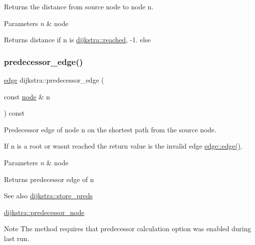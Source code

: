 Returns the distance from source node to node {\ttfamily n}. 


\begin{DoxyParams}{Parameters}
{\em n} & node\\
\hline
\end{DoxyParams}
\begin{DoxyReturn}{Returns}
distance if {\ttfamily n} is \mbox{\hyperlink{classdijkstra_a405ff80abfc9ad98668534032eed6a5b}{dijkstra\+::reached}}, {\ttfamily -\/1.} else 
\end{DoxyReturn}
\mbox{\label{classdijkstra_aa3ef1a7d7dfc33e4a39aff309f873929}} 
\subsubsection{\texorpdfstring{predecessor\+\_\+edge()}{predecessor\_edge()}}
{\footnotesize\ttfamily \mbox{\hyperlink{classedge}{edge}} dijkstra\+::predecessor\+\_\+edge (\begin{DoxyParamCaption}\item[{const \mbox{\hyperlink{classnode}{node}} \&}]{n }\end{DoxyParamCaption}) const}



Predecessor edge of node {\ttfamily n} on the shortest path from the source node. 

If {\ttfamily n} is a root or wasn\textquotesingle{}t reached the return value is the invalid edge \mbox{\hyperlink{classedge_a41859d2473a15e24255d7bc0de1f49b4}{edge\+::edge()}}.


\begin{DoxyParams}{Parameters}
{\em n} & node\\
\hline
\end{DoxyParams}
\begin{DoxyReturn}{Returns}
predecessor edge of {\ttfamily n} 
\end{DoxyReturn}
\begin{DoxySeeAlso}{See also}
\mbox{\hyperlink{classdijkstra_af79383dbbb6b737afcefd8e32350192d}{dijkstra\+::store\+\_\+preds}} 

\mbox{\hyperlink{classdijkstra_a99c17ee7c2b55574ea8c2952fac09faf}{dijkstra\+::predecessor\+\_\+node}}
\end{DoxySeeAlso}
\begin{DoxyNote}{Note}
The method requires that predecessor calculation option was enabled during last run. 
\end{DoxyNote}
\mbox{\label{classdijkstra_a99c17ee7c2b55574ea8c2952fac09faf}} 

